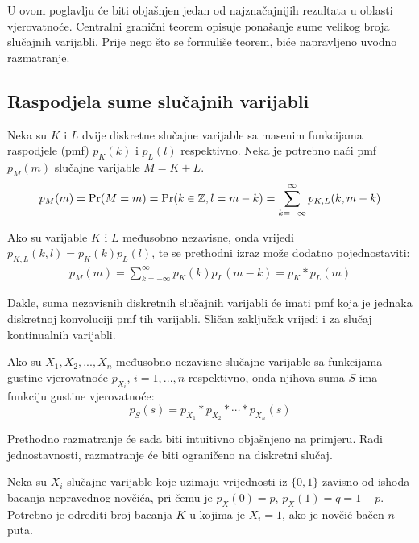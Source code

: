 U ovom poglavlju će biti objašnjen jedan od najznačajnijih rezultata u oblasti
vjerovatnoće. Centralni granični teorem opisuje ponašanje sume velikog broja
slučajnih varijabli. Prije nego što se formuliše teorem, biće napravljeno uvodno
razmatranje.

\subsection{Raspodjela sume slučajnih varijabli}

Neka su $K$ i $L$ dvije diskretne slučajne varijable sa masenim funkcijama
raspodjele (pmf) $p_K(k)$ i $p_L(l)$ respektivno. Neka je potrebno naći pmf
$p_M(m)$ slučajne varijable $M=K+L$.
%
\begin{align*}
  p_M(m) = \mathrm{Pr}(M=m) = \mathrm{Pr}(k\in\mathbb{Z}, l=m-k)
  = \sum_{k=-\infty}^{\infty} p_{K,L}(k,m-k)
\end{align*}

Ako su varijable $K$ i $L$ međusobno nezavisne, onda vrijedi $p_{K,L}(k,l) =
p_K(k)p_L(l)$, te se prethodni izraz može dodatno pojednostaviti:
%
\begin{align*}
  p_M(m) = \sum_{k=-\infty}^{\infty} p_K(k)p_L(m-k) = p_K * p_L (m)
\end{align*}

Dakle, suma nezavisnih diskretnih slučajnih varijabli će imati pmf koja je
jednaka diskretnoj konvoluciji pmf tih varijabli. Sličan zaključak vrijedi i za
slučaj kontinualnih varijabli.

\begin{theorem} %

  Ako su $X_1,X_2,...,X_n$ međusobno nezavisne slučajne varijable sa funkcijama
  gustine vjerovatnoće $p_{X_i}$, $i=1,...,n$ respektivno, onda njihova suma $S$
  ima funkciju gustine vjerovatnoće:
  $$p_S(s) = p_{X_1} * p_{X_2} * \cdots * p_{X_n} (s)$$

\end{theorem}

Prethodno razmatranje će sada biti intuitivno objašnjeno na primjeru.  Radi
jednostavnosti, razmatranje će biti ograničeno na diskretni slučaj.

\begin{exmp} \label{ex:novcic}
  
Neka su $X_i$ slučajne varijable koje uzimaju vrijednosti iz $\{0,1\}$ zavisno
od ishoda bacanja nepravednog novčića, pri čemu je $p_X(0)= p$, $p_X(1)=q=1-p$.
Potrebno je odrediti broj bacanja $K$ u kojima je $X_i=1$, ako je novčić bačen
$n$ puta.

\end{exmp}

